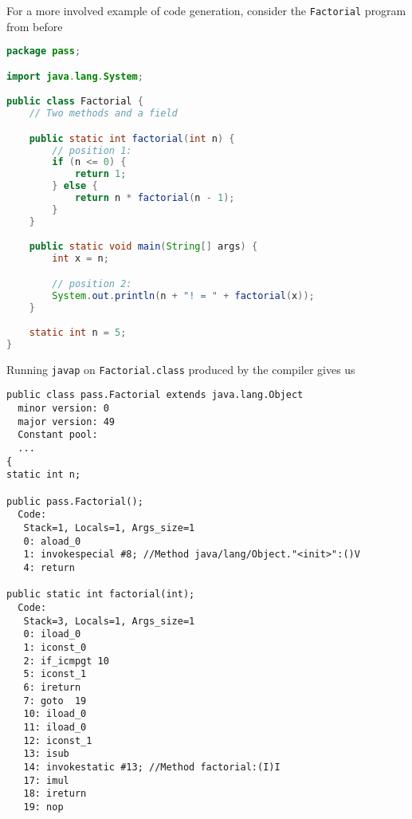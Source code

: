 \documentclass[8pt,a4paper,compress]{beamer}
\begin{document}
\begin{frame}[fragile]
\pause

For a more involved example of code generation, consider the \lstinline{Factorial} program from before

\smallskip

\begin{lstlisting}[language=Java,style=focusin]
package pass;

import java.lang.System;

public class Factorial {
    // Two methods and a field

    public static int factorial(int n) {
        // position 1:
        if (n <= 0) {
            return 1;
        } else {
            return n * factorial(n - 1);
        }
    }

    public static void main(String[] args) {
        int x = n;

        // position 2:
        System.out.println(n + "! = " + factorial(x));
    }

    static int n = 5;
}
\end{lstlisting}
\end{frame}

\begin{frame}[fragile]
\pause

Running \lstinline{javap} on \lstinline{Factorial.class} produced by the \jmm compiler gives us

\smallskip

\begin{lstlisting}[language={},style=focusin]
public class pass.Factorial extends java.lang.Object
  minor version: 0
  major version: 49
  Constant pool:
  ...
{
static int n;

public pass.Factorial();
  Code:
   Stack=1, Locals=1, Args_size=1
   0: aload_0
   1: invokespecial #8; //Method java/lang/Object."<init>":()V
   4: return

public static int factorial(int);
  Code:
   Stack=3, Locals=1, Args_size=1
   0: iload_0
   1: iconst_0
   2: if_icmpgt 10
   5: iconst_1
   6: ireturn
   7: goto  19
   10: iload_0
   11: iload_0
   12: iconst_1
   13: isub
   14: invokestatic #13; //Method factorial:(I)I
   17: imul
   18: ireturn
   19: nop
\end{lstlisting}
\end{frame}
\end{document}
